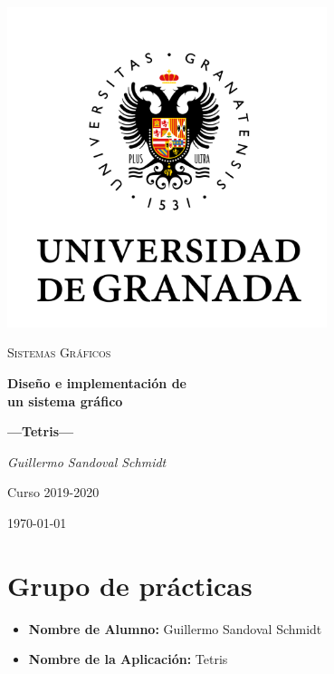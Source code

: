 \documentclass[11pt,a4paper]{article}
\begin{document}
\sloppy
\begin{titlepage}
  \centering
  \includegraphics[width=0.7\textwidth]{logo.png}\par\vspace{1cm}
  {\scshape\large Sistemas Gráficos \par} \vspace{1cm}
  {\huge\bfseries Diseño e implementación de \\ un sistema gráfico \par}
  \vspace{0.4cm}
  {\large\bfseries ---Tetris---\\}
  \vspace{0.6cm}
  {\large\itshape  Guillermo Sandoval Schmidt  \par} \vspace{1.00cm}
  Curso 2019-2020 \\
  \vfill

  {\large \today\par}
\end{titlepage}

\tableofcontents
\thispagestyle{empty}

\newpage

\section{Grupo de prácticas}
\begin{itemize}
    \item \textbf{Nombre de Alumno:} Guillermo Sandoval Schmidt
    \item \textbf{Nombre de la Aplicación:} Tetris
\end{itemize}
\end{document}
